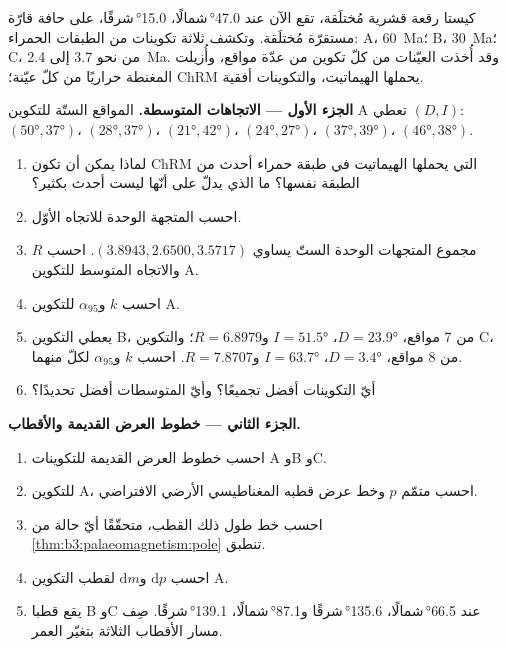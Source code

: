 \begin{problem}
\label{pb:b3:palaeomagnetism:1}
كيستا رقعة قشرية مُختلَقة، تقع الآن عند \ang{47.0}\,شمالًا، \ang{15.0}\,شرقًا، على حافة
قارّة مستقرّة مُختلَقة. وتكشف ثلاثة تكوينات من الطبقات الحمراء: A،
\qty{60}{Ma}؛ B، \qty{30}{Ma}؛ C، من نحو 3.7 إلى \qty{2.4}{Ma}. وقد أُخذت العيّنات من كلّ تكوين
من عدّة مواقع، وأُزيلت المغنطة حراريًا من كلّ عيّنة؛ 
ChRM يحملها الهيماتيت، والتكوينات أفقية.

\medskip\noindent\textbf{الجزء الأول --- الاتجاهات المتوسطة.} المواقع الستّة
للتكوين A تعطي $(D, I)$: $(\ang{50}, \ang{37})$، $(\ang{28}, \ang{37})$،
$(\ang{21}, \ang{42})$، $(\ang{24}, \ang{27})$، $(\ang{37}, \ang{39})$،
$(\ang{46}, \ang{38})$.
\begin{enumerate}
  \item لماذا يمكن أن تكون  ChRM التي يحملها الهيماتيت في طبقة حمراء أحدث من
        الطبقة نفسها؟ ما الذي يدلّ على أنّها ليست أحدث بكثير؟
  \item احسب المتجهة الوحدة للاتجاه الأوّل.
  \item مجموع المتجهات الوحدة الستّ يساوي $(3.8943, 2.6500, 3.5717)$. احسب $R$
        والاتجاه المتوسط للتكوين A.
  \item احسب $k$ و$\alpha_{95}$ للتكوين A.
  \item يعطي التكوين B، من 7 مواقع، $D = \ang{23.9}$، $I = \ang{51.5}$
        و$R = 6.8979$؛ والتكوين C، من 8 مواقع، $D = \ang{3.4}$، $I =
        \ang{63.7}$ و$R = 7.8707$. احسب $k$ و$\alpha_{95}$ لكلّ منهما.
  \item أيّ التكوينات أفضل تجميعًا؟ وأيّ المتوسطات أفضل تحديدًا؟
\end{enumerate}

\medskip\noindent\textbf{الجزء الثاني --- خطوط العرض القديمة والأقطاب.}
\begin{enumerate}[resume]
  \item احسب خطوط العرض القديمة للتكوينات A وB وC.
  \item للتكوين A، احسب متمّم  $p$ وخط عرض
        قطبه المغناطيسي الأرضي الافتراضي.
  \item احسب خط طول ذلك القطب، متحقّقًا أيّ حالة من
        \cref{thm:b3:palaeomagnetism:pole} تنطبق.
  \item احسب $\mathrm dp$ و$\mathrm dm$ لقطب التكوين A.
  \item يقع قطبا B وC عند \ang{66.5}\,شمالًا، \ang{135.6}\,شرقًا
        و\ang{87.1}\,شمالًا، \ang{139.1}\,شرقًا. صِف مسار الأقطاب الثلاثة
        بتغيّر العمر.
\end{enumerate}


\end{problem}

